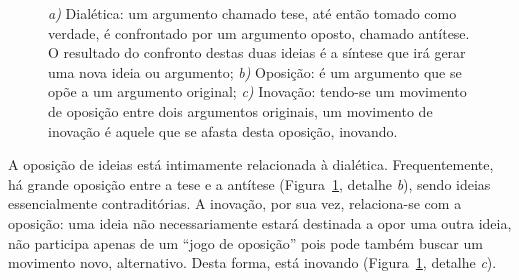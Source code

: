 \begin{figure}[ht!]
\begin{center}


\caption{\textit{a)} Dialética: um argumento chamado tese, até então
  tomado como verdade, é confrontado por um argumento oposto, chamado
  antítese. O resultado do confronto destas duas ideias é a síntese
  que irá gerar uma nova ideia ou argumento; \textit{b)} Oposição: é
  um argumento que se opõe a um argumento original; \textit{c)}
  Inovação: tendo-se um movimento de oposição entre dois argumentos
  originais, um movimento de inovação é aquele que se afasta desta
  oposição, inovando.}
\label{fig:conceitos}
\end{center}
\end{figure}

A oposição de ideias está intimamente relacionada à
dialética. Frequentemente, há grande oposição entre a tese e a
antítese (Figura~\ref{fig:conceitos}, detalhe \textit{b}), sendo
ideias essencialmente contraditórias. A inovação, por sua vez,
relaciona-se com a oposição: uma ideia não necessariamente estará
destinada a opor uma outra ideia, não participa apenas de um ``jogo de
oposição'' pois pode também buscar um movimento novo,
alternativo. Desta forma, está inovando (Figura~\ref{fig:conceitos},
detalhe \textit{c}).

